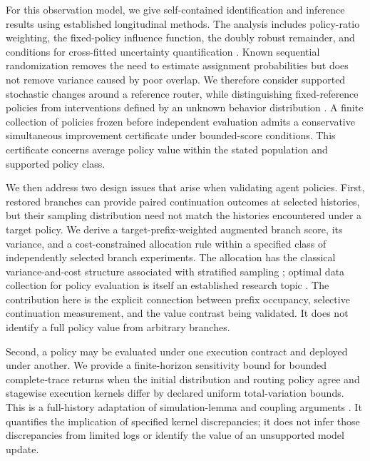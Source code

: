 For this observation model, we give self-contained identification and inference results using established longitudinal methods. The analysis includes policy-ratio weighting, the fixed-policy influence function, the doubly robust remainder, and conditions for cross-fitted uncertainty quantification \citep{bang2005dr,kallus2020drl}. Known sequential randomization removes the need to estimate assignment probabilities but does not remove variance caused by poor overlap. We therefore consider supported stochastic changes around a reference router, while distinguishing fixed-reference policies from interventions defined by an unknown behavior distribution \citep{kennedy2019incremental}. A finite collection of policies frozen before independent evaluation admits a conservative simultaneous improvement certificate under bounded-score conditions. This certificate concerns average policy value within the stated population and supported policy class.

We then address two design issues that arise when validating agent policies. First, restored branches can provide paired continuation outcomes at selected histories, but their sampling distribution need not match the histories encountered under a target policy. We derive a target-prefix-weighted augmented branch score, its variance, and a cost-constrained allocation rule within a specified class of independently selected branch experiments. The allocation has the classical variance-and-cost structure associated with stratified sampling \citep{neyman1934representative}; optimal data collection for policy evaluation is itself an established research topic \citep{li2023allocation}. The contribution here is the explicit connection between prefix occupancy, selective continuation measurement, and the value contrast being validated. It does not identify a full policy value from arbitrary branches.

Second, a policy may be evaluated under one execution contract and deployed under another. We provide a finite-horizon sensitivity bound for bounded complete-trace returns when the initial distribution and routing policy agree and stagewise execution kernels differ by declared uniform total-variation bounds. This is a full-history adaptation of simulation-lemma and coupling arguments \citep{kearns2002near,lobel2024simulation}. It quantifies the implication of specified kernel discrepancies; it does not infer those discrepancies from limited logs or identify the value of an unsupported model update.


